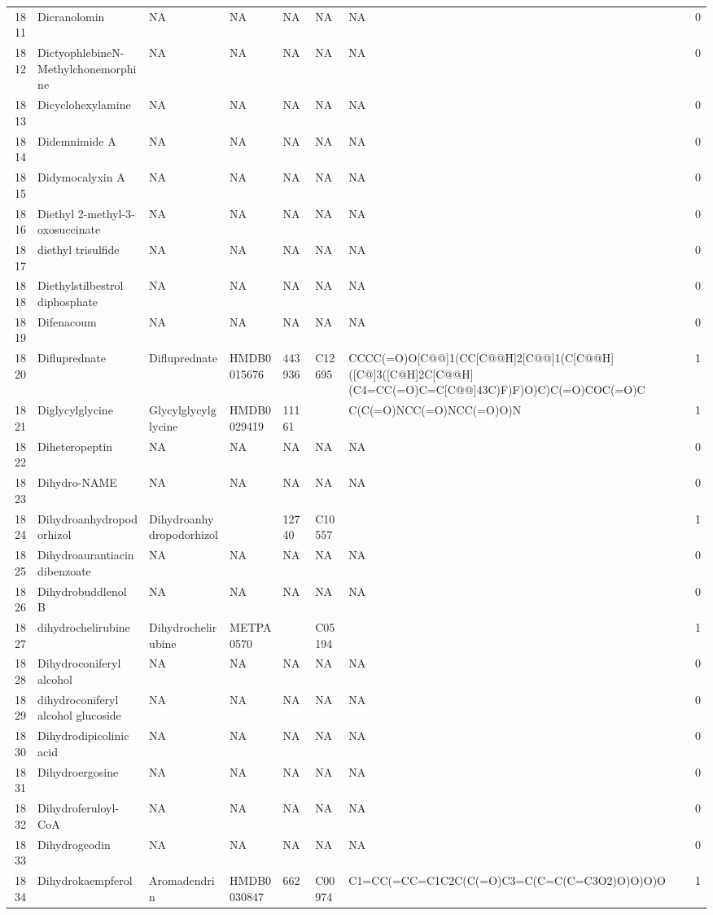 \documentclass[a4paper]{article}
\begin{document}
\begin{longtable}{rlllllll}
  1811 & Dicranolomin & NA & NA & NA & NA & NA & 0 \\ 
  1812 & DictyophlebineN-Methylchonemorphine & NA & NA & NA & NA & NA & 0 \\ 
  1813 & Dicyclohexylamine & NA & NA & NA & NA & NA & 0 \\ 
  1814 & Didemnimide A & NA & NA & NA & NA & NA & 0 \\ 
  1815 & Didymocalyxin A & NA & NA & NA & NA & NA & 0 \\ 
  1816 & Diethyl 2-methyl-3-oxosuccinate & NA & NA & NA & NA & NA & 0 \\ 
  1817 & diethyl trisulfide & NA & NA & NA & NA & NA & 0 \\ 
  1818 & Diethylstilbestrol diphosphate & NA & NA & NA & NA & NA & 0 \\ 
  1819 & Difenacoum & NA & NA & NA & NA & NA & 0 \\ 
  1820 & Difluprednate & Difluprednate & HMDB0015676 & 443936 & C12695 & CCCC(=O)O[C@@]1(CC[C@@H]2[C@@]1(C[C@@H]([C@]3([C@H]2C[C@@H](C4=CC(=O)C=C[C@@]43C)F)F)O)C)C(=O)COC(=O)C & 1 \\ 
  1821 & Diglycylglycine & Glycylglycylglycine & HMDB0029419 & 11161 &  & C(C(=O)NCC(=O)NCC(=O)O)N & 1 \\ 
  1822 & Diheteropeptin & NA & NA & NA & NA & NA & 0 \\ 
  1823 & Dihydro-NAME & NA & NA & NA & NA & NA & 0 \\ 
  1824 & Dihydroanhydropodorhizol & Dihydroanhydropodorhizol &  & 12740 & C10557 &  & 1 \\ 
  1825 & Dihydroaurantiacin dibenzoate & NA & NA & NA & NA & NA & 0 \\ 
  1826 & Dihydrobuddlenol B & NA & NA & NA & NA & NA & 0 \\ 
  1827 & dihydrochelirubine & Dihydrochelirubine & METPA0570 &  & C05194 &  & 1 \\ 
  1828 & Dihydroconiferyl alcohol & NA & NA & NA & NA & NA & 0 \\ 
  1829 & dihydroconiferyl alcohol glucoside & NA & NA & NA & NA & NA & 0 \\ 
  1830 & Dihydrodipicolinic acid & NA & NA & NA & NA & NA & 0 \\ 
  1831 & Dihydroergosine & NA & NA & NA & NA & NA & 0 \\ 
  1832 & Dihydroferuloyl-CoA & NA & NA & NA & NA & NA & 0 \\ 
  1833 & Dihydrogeodin & NA & NA & NA & NA & NA & 0 \\ 
  1834 & Dihydrokaempferol & Aromadendrin & HMDB0030847 & 662 & C00974 & C1=CC(=CC=C1C2C(C(=O)C3=C(C=C(C=C3O2)O)O)O)O & 1 \\ 

\end{longtable}
\end{document}
